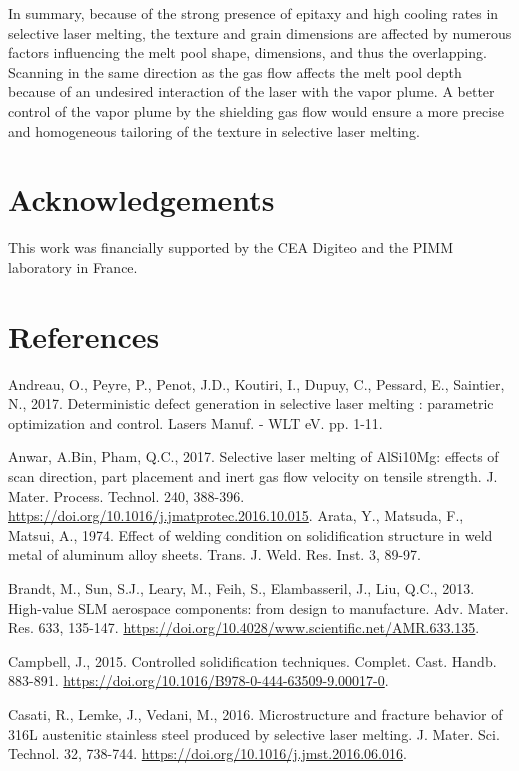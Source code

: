 \documentclass[10pt]{article}
\begin{document}
In summary, because of the strong presence of epitaxy and high cooling rates in selective laser melting, the texture and grain dimensions are affected by numerous factors influencing the melt pool shape, dimensions, and thus the overlapping. Scanning in the same direction as the gas flow affects the melt pool depth because of an undesired interaction of the laser with the vapor plume. A better control of the vapor plume by the shielding gas flow would ensure a more precise and homogeneous tailoring of the texture in selective laser melting.

\section*{Acknowledgements}
This work was financially supported by the CEA Digiteo and the PIMM laboratory in France.

\section*{References}
Andreau, O., Peyre, P., Penot, J.D., Koutiri, I., Dupuy, C., Pessard, E., Saintier, N., 2017. Deterministic defect generation in selective laser melting : parametric optimization and control. Lasers Manuf. - WLT eV. pp. 1-11.

Anwar, A.Bin, Pham, Q.C., 2017. Selective laser melting of AlSi10Mg: effects of scan direction, part placement and inert gas flow velocity on tensile strength. J. Mater. Process. Technol. 240, 388-396. \href{https://doi.org/10.1016/j.jmatprotec.2016.10.015}{https://doi.org/10.1016/j.jmatprotec.2016.10.015}. Arata, Y., Matsuda, F., Matsui, A., 1974. Effect of welding condition on solidification structure in weld metal of aluminum alloy sheets. Trans. J. Weld. Res. Inst. 3, 89-97.

Brandt, M., Sun, S.J., Leary, M., Feih, S., Elambasseril, J., Liu, Q.C., 2013. High-value SLM aerospace components: from design to manufacture. Adv. Mater. Res. 633, 135-147. \href{https://doi.org/10.4028/www.scientific.net/AMR.633.135}{https://doi.org/10.4028/www.scientific.net/AMR.633.135}.

Campbell, J., 2015. Controlled solidification techniques. Complet. Cast. Handb. 883-891. \href{https://doi.org/10.1016/B978-0-444-63509-9.00017-0}{https://doi.org/10.1016/B978-0-444-63509-9.00017-0}.

Casati, R., Lemke, J., Vedani, M., 2016. Microstructure and fracture behavior of 316L austenitic stainless steel produced by selective laser melting. J. Mater. Sci. Technol. 32, 738-744. \href{https://doi.org/10.1016/j.jmst.2016.06.016}{https://doi.org/10.1016/j.jmst.2016.06.016}.
\end{document}
